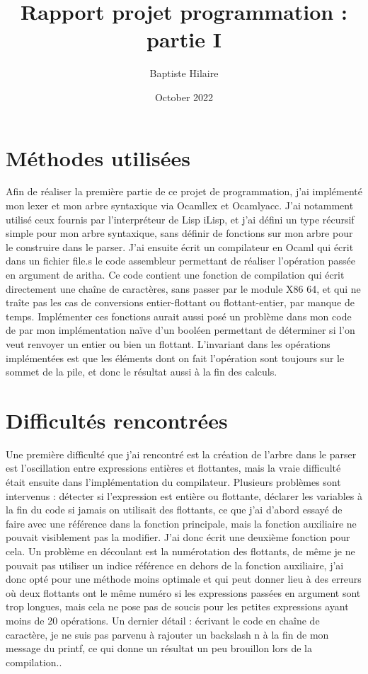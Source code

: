 \documentclass{article}
\title{Rapport projet programmation : partie I}
\author{Baptiste Hilaire }
\date{October 2022}
\begin{document}
\maketitle

\section{Méthodes utilisées}
\hspace{0.5 cm}
Afin de réaliser la première partie de ce projet de programmation, j'ai implémenté mon lexer et mon arbre syntaxique via Ocamllex et Ocamlyacc. J'ai notamment utilisé ceux fournis par l'interpréteur de Lisp iLisp, et j'ai défini un type récursif simple pour mon arbre syntaxique, sans définir de fonctions sur mon arbre pour le construire dans le parser. J'ai ensuite écrit un compilateur en Ocaml qui écrit dans un fichier file.s le code assembleur permettant de réaliser l'opération passée en argument de aritha. Ce code contient une fonction de compilation qui écrit directement une chaîne de caractères, sans passer par le module X86 64, et qui ne traîte pas les cas de conversions entier-flottant ou flottant-entier, par manque de temps. Implémenter ces fonctions aurait aussi posé un problème dans mon code de par mon implémentation naïve d'un booléen permettant de déterminer si l'on veut renvoyer un entier ou bien un flottant. L'invariant dans les opérations implémentées est que les éléments dont on fait l'opération sont toujours sur le sommet de la pile, et donc le résultat aussi à la fin des calculs.

\section{Difficultés rencontrées}
\hspace{0.5 cm}
Une première difficulté que j'ai rencontré est la création de l'arbre dans le parser est l'oscillation entre expressions entières et flottantes, mais la vraie difficulté était ensuite dans l'implémentation du compilateur. Plusieurs problèmes sont intervenus : détecter si l'expression est entière ou flottante, déclarer les variables à la fin du code si jamais on utilisait des flottants, ce que j'ai d'abord essayé de faire avec une référence dans la fonction principale, mais la fonction auxiliaire ne pouvait visiblement pas la modifier. J'ai donc écrit une deuxième fonction pour cela. Un problème en découlant est la numérotation des flottants, de même je ne pouvait pas utiliser un indice référence en dehors de la fonction auxiliaire, j'ai donc opté pour une méthode moins optimale et qui peut donner lieu à des erreurs où deux flottants ont le même numéro si les expressions passées en argument sont trop longues, mais cela ne pose pas de soucis pour les petites expressions ayant moins de 20 opérations. Un dernier détail : écrivant le code en chaîne de caractère, je ne suis pas parvenu à rajouter un backslash n à la fin de mon message du printf, ce qui donne un résultat un peu brouillon lors de la compilation..
\end{document}
